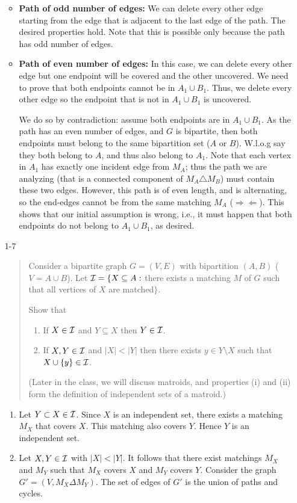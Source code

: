 \documentclass[12pt]{article}
\begin{document}
\begin{enumerate}
\begin{itemize}
\item \textbf{Path of odd number of edges:} We can delete every other edge
starting from the edge that is adjacent to the last edge of the path.
The desired properties hold.
Note that this is possible only because the path has odd number of edges.
		
\item \textbf{Path of even number of edges:} In this case, we can delete every other edge
but one endpoint will be covered and the other uncovered.
We need to prove that both endpoints cannot be in $A_1\cup B_1$.
Thus, we delete every other edge so the endpoint that is not in $A_1\cup B_1$ is uncovered.
		
We do so by contradiction: assume both endpoints are in $A_1\cup B_1$.
As the path has an even number of edges, and $G$ is bipartite, then both endpoints
must belong to the same bipartition set ($A$ or $B$).
W.l.o.g say they both belong to $A$, and thus also belong to $A_1$.
Note that each vertex in $A_1$ has exactly one incident edge from $M_A$;
thus the path we are analyzing (that is a connected component of $M_A \triangle M_B$)
must contain these two edges. However, this path is of even length,
and is alternating, so the end-edges cannot be from the same matching $M_A$ ($\Longrightarrow\Longleftarrow$).
This shows that our initial assumption is wrong, i.e., it must happen that
both endpoints do not belong to $A_1\cup B_1$, as desired.
\end{itemize}

\item[1-7] %
\begin{quote}
Consider a bipartite graph $G=(V,E)$ with bipartition $(A,B)$
($V=A\cup B$). Let ${\cal I}=\{X\subseteq A:$ there exists a matching
$M$ of $G$ such that all vertices of $X$ are matched$\}$. 

Show that 
\begin{enumerate}
\item
If $X\in {\cal I}$ and $Y\subseteq X$ then $Y\in {\cal I}$.
\item
If $X, Y\in {\cal I}$ and $|X|<|Y|$ then there exists $y\in Y\setminus
X$ such that $X\cup\{y\}\in {\cal I}$. 
\end{enumerate}
(Later in the class, we will discuss matroids, and properties (i) and
(ii) form the definition of independent sets of a matroid.)
\end{quote}

\begin{enumerate}
\item Let $Y \subset X \in {\cal I}$. Since $X$ is an
independent set, there exists a matching $M_X$ that covers $X$. This
matching also covers $Y$. Hence $Y$ is an independent set.
\item Let $X,Y \in {\cal I}$ with $|X| < |Y|$. It follows that
there exist matchings $M_X$ and $M_Y$ such that $M_X$ covers $X$ and
$M_Y$ covers $Y$. Consider the graph $G' = (V,M_X \Delta M_Y)$. The
set of edges of $G'$ is the union of paths and cycles.


\end{enumerate}
\end{enumerate}
\end{document}
